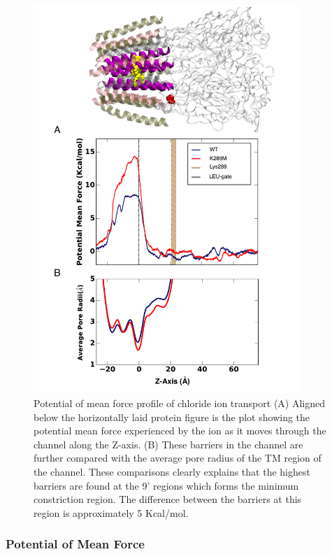 \documentclass[journal=jacsat,manuscript=article]{achemso}
\begin{document}
\begin{figure}
\begin{center}
\includegraphics[width = 100mm]{figures/ABF_pic_2.pdf}
\caption{ Potential of mean force profile of chloride ion transport  (A) Aligned below the horizontally laid protein figure is the plot showing the potential mean force experienced by the ion as it moves through the channel along the Z-axis. (B) These barriers in the channel are further compared with the average pore radius of the TM region of the channel. These comparisons clearly explains that the highest barriers are found at the 9' regions which forms the minimum constriction region. The difference between the barriers at this region is approximately 5 Kcal/mol.}
\label{fig:abf}
\end{center}
\end{figure}

\subsubsection*{Potential of Mean Force}
\end{document}
